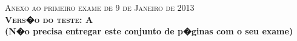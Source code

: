 \documentclass{docist}
\begin{document}
\thispagestyle{empty}

\begin{center}
  {\Large \textsc{Anexo ao primeiro exame de 9 de Janeiro de 2013\\[2ex]
      \textbf{Vers�o do teste: A}\\[2ex]}}
  {\normalsize  \textbf{(N�o precisa entregar este conjunto de p�ginas com o seu exame)}}
\end{center}




\wikipediaWarning

\qGHCStakeholders

\qGHCChunks

\qGHCDesugaring

\qGHCRTS

\qGHCPipeAndFilter

\qZeroMQApps

\qZeroMQWorkersPerCore

\qZeroMQMessagingPatterns

\qZeroMQBatching

\qZeroMQLockFree

\qnginxFirstAD

\qnginxEventDriven

\qnginxModuleTypes

\qnginxOSOptimizations

\qnginxProcessThread

\qWebPartioning

\qWebPartitioningDois

\qWebRedundancy

\qThreeVsFourTiers

\qWebLoadBalancer

\qDomainLogicFenix

\qIncrementalReleases

\qScalability

\qSOA

\qAvailability

\qChromiumDecomposition

\qSecurity

\qSkeletonSystem

\qArqEmailMTAIMAP

\qAspects
\end{document}
